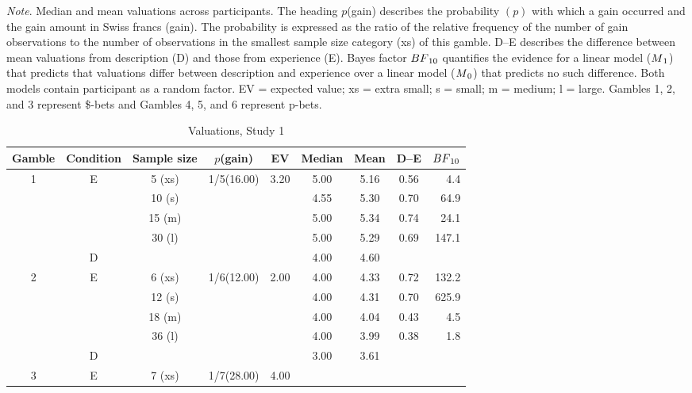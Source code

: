 \documentclass[a4paper,man, natbib]{apa6} %
\begin{document}
\newpage


\begin{ThreePartTable}
\begin{TableNotes}
\small
\item \textit{Note}. Median and mean valuations across participants. The heading $p$(gain) describes the probability $(p)$ with which a gain occurred and the gain amount in Swiss francs (gain). The probability is expressed as the ratio of the relative frequency of the number of gain observations to the number of observations in the smallest sample size category (xs) of this gamble. D--E describes the difference between mean valuations from description (D) and those from experience (E). Bayes factor $BF\textsubscript{10}$ quantifies the evidence for a linear model ($M\textsubscript{1}$) that predicts that valuations differ between description and experience over a linear model ($M\textsubscript{0}$) that predicts no such difference. Both models contain participant as a random factor. EV = expected value; xs = extra small; s = small; m = medium; l = large. Gambles 1, 2, and 3 represent \$-bets and Gambles 4, 5, and 6 represent p-bets.
\end{TableNotes}
\footnotesize
\begin{longtable}{ccccccccr}
\caption{Valuations, Study 1}\label{table:meansStudy2}\\
\toprule
Gamble & Condition & Sample size & \(p\)(gain) & EV& Median & Mean& D--E & $BF\textsubscript{10}$\\
\midrule
\multirow{5}{*}{1} &\multirow{4}{*}{E} & 5 (xs)  & \multirow{5}{*}{1/5(16.00)}& \multirow{5}{*}{3.20}
 & 5.00 & 5.16 & 0.56 & 4.4\\
&& 10 (s) &&& 4.55 & 5.30& 0.70&64.9 \\
&& 15 (m)&&&5.00 & 5.34 & 0.74&24.1\\
&& 30 (l)&&& 5.00 & 5.29& 0.69&147.1\\
& D &&&&  4.00 & 4.60 && \\
\midrule
\multirow{5}{*}{2} &\multirow{4}{*}{E} & 6 (xs)  & \multirow{5}{*}{1/6(12.00)}&  \multirow{5}{*}{2.00}
& 4.00 & 4.33 & 0.72 &132.2\\
&& 12 (s) &&&   4.00 & 4.31 & 0.70&625.9 \\
&& 18 (m) &&&   4.00 & 4.04 & 0.43&4.5 \\
&& 36 (l) &&&   4.00 & 3.99 & 0.38 &1.8\\
& D &&&&   3.00 & 3.61 && \\
\midrule
\multirow{5}{*}{3} &\multirow{4}{*}{E} & 7 (xs)  & \multirow{5}{*}{1/7(28.00)}& \multirow{5}{*}{4.00}

\end{longtable}
\end{ThreePartTable}
\end{document}

